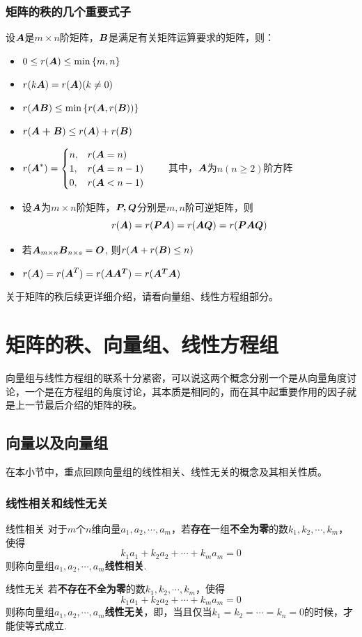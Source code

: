 \documentclass[12pt, a4paper, oneside, UTF8]{ctexbook}
\begin{document}
\subsubsection{矩阵的秩的几个重要式子}
设$\boldsymbol{A}$是$m\times n$阶矩阵，$\boldsymbol{B}$是满足有关矩阵运算要求的矩阵，则：
\begin{itemize}[leftmargin=4em]
    \item $0\leq r(\boldsymbol{A})\leq \min{ \{m,n\}  }$
    \item $r(k\boldsymbol{A}) = r(\boldsymbol{A})(k\neq 0)$
    \item $r(\boldsymbol{AB}) \leq \min{\{r(\boldsymbol{A}, r(\boldsymbol{B}))\} }$
    \item $r(\boldsymbol{A+B})\leq r(\boldsymbol{A}) + r(\boldsymbol{B})$
    \item $r(\boldsymbol{A}^*)=\begin{cases}
        n,&r(\boldsymbol{A}=n)\\
        1,&r(\boldsymbol{A}=n-1)\\
        0,&r(\boldsymbol{A}<n-1)
    \end{cases}$
    \ \ \ \ 其中，$\boldsymbol{A}$为$n(n\geq2)$阶方阵
    \item 设$\boldsymbol{A}$为$m\times n$阶矩阵，$\boldsymbol{P,Q}$分别是$m,n$阶可逆矩阵，则\[r(\boldsymbol{A})=r(\boldsymbol{PA})=r(\boldsymbol{AQ})=r(\boldsymbol{PAQ})\]
    \item 若$\boldsymbol{A}_{m\times n}\boldsymbol{B}_{n\times s}=\boldsymbol{O}$, 则$r(\boldsymbol{A}+r(\boldsymbol{B})\leq n)$
    \item $r(\boldsymbol{A})=r(\boldsymbol{A}^T)=r(\boldsymbol{AA^T})=r(\boldsymbol{A^TA})$
\end{itemize}

关于矩阵的秩后续更详细介绍，请看向量组、线性方程组部分。
\section{矩阵的秩、向量组、线性方程组}
向量组与线性方程组的联系十分紧密，可以说这两个概念分别一个是从向量角度讨论，一个是在方程组的角度讨论，其本质是相同的，而在其中起重要作用的因子就是上一节最后介绍的矩阵的秩。
\subsection{向量以及向量组}
在本小节中，重点回顾向量组的线性相关、线性无关的概念及其相关性质。
\subsubsection{线性相关和线性无关}
\begin{defn}{线性相关}{}
    对于$m$个$n$维向量$a_1, a_2, \cdots, a_m$，若\textbf{存在}一组\textbf{不全为零}的数$k_1, k_2, \cdots, k_m$，使得\[k_1a_1+k_2a_2+\cdots+k_ma_m=0\]则称向量组$a_1,a_2,\cdots,a_m$\textbf{线性相关}.
\end{defn}
\begin{defn}{线性无关}{}
    若\textbf{不存在不全为零}的数$k_1, k_2, \cdots, k_m$，使得\[k_1a_1+k_2a_2+\cdots+k_ma_m=0\]则称向量组$a_1,a_2,\cdots,a_m$\textbf{线性无关}，即，当且仅当$k_1=k_2=\cdots=k_n=0$的时候，才能使等式成立.
\end{defn}
\newpage
\end{document}
